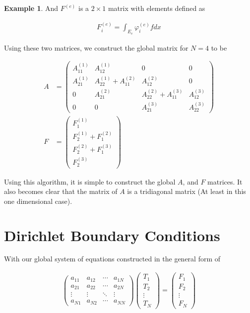 \documentclass[10pt]{amsart}
\numberwithin{equation}{section}
\theoremstyle{definition}
\newtheorem{example}{Example}[section]
\begin{document}
\begin{multicols}{2}
\begin{example}
  And $F^{(e)}$ is a $2\times 1$ matrix with elements defined as

  \begin{align*}
    F_i^{(e)}=\int_{E_e}\varphi_i^{(e)}fdx
  \end{align*}

  Using these two matrices, we construct the global matrix for $N=4$ to be

  \begin{align*}
    A&=\begin{pmatrix}
      A_{11}^{(1)} & A_{12}^{(1)} & 0 & 0\\
      A_{21}^{(1)} & A_{22}^{(1)}+A_{11}^{(2)} & A_{12}^{(2)} & 0\\
      0 & A_{21}^{(2)} & A_{22}^{(2)}+A_{11}^{(3)} & A_{12}^{(3)}\\
      0 & 0 & A_{21}^{(3)} & A_{22}^{(3)}
    \end{pmatrix}\\
    F&=\begin{pmatrix}
      F_1^{(1)}\\
      F_2^{(1)}+F_1^{(2)}\\
      F_2^{(2)}+F_1^{(3)}\\
      F_2^{(3)}
    \end{pmatrix}
  \end{align*}
\end{example}

Using this algorithm, it is simple to construct the global $A$, and $F$
matrices. It also becomes clear that the matrix of $A$ is a tridiagonal
matrix (At least in this one dimensional case).

\section{Dirichlet Boundary Conditions}%
\label{sec:section_name}

With our global system of equations constructed in the general form of

\begin{align}\label{eq:global_sys}
  \begin{pmatrix}
    a_{11} & a_{12} & \cdots & a_{1N}\\
    a_{21} & a_{22} & \cdots & a_{2N}\\
    \vdots & \vdots & \ddots & \vdots \\
    a_{N1} & a_{N2} & \cdots & a_{NN}
  \end{pmatrix}
  \begin{pmatrix}
    T_1 \\ T_2 \\ \vdots \\ T_N
  \end{pmatrix}
  =
  \begin{pmatrix}
    F_1 \\ F_2 \\ \vdots \\ F_N
  \end{pmatrix}
\end{align}


\end{multicols}
\end{document}
